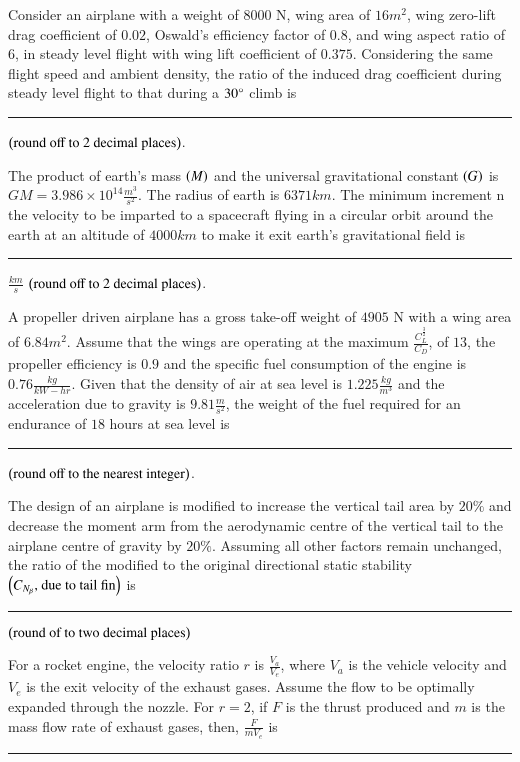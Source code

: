 \documentclass[journal]{IEEEtran}
\begin{document}
\begin{enumerate}
{\begin{figure}[H]
\label{fig:my_label}
\end{figure}
}
\item{
Consider an airplane with a weight of $8000$ N, wing area of $16m^2$, wing zero-lift drag coefficient of $0.02$, Oswald's efficiency factor of $0.8$, and wing aspect ratio of $6$, in steady level flight with wing lift coefficient of $0.375$. Considering the same flight speed and ambient density, the ratio of the induced drag coefficient during steady level flight to that during a $30\degree$ climb is \rule{2cm}{0.15mm}$\left(\text{round off to $2$ decimal places}\right)$.\\
\item{
The product of earth's mass $\left(M\right)$ and the universal gravitational constant $\left(G\right)$ is $GM=3.986\times10^{14}\frac{m^3}{s^2}$. The radius of earth is $6371km$. The minimum increment n the velocity to be imparted to a spacecraft flying in a circular orbit around the earth at an altitude of $4000km$ to make it exit earth's gravitational field is \rule{2cm}{0.15mm}$\frac{km}{s}$ $\left(\text{round off to $2$ decimal places}\right)$.\\
}
\item{
A propeller driven airplane has a gross take-off weight of $4905$ N with a wing area of $6.84 m^2$. Assume that the wings are operating at the maximum $\frac{C_L^{\frac{3}{2}}}{C_D}$, of $13$, the propeller efficiency is $0.9$ and the specific fuel consumption of the engine is $0.76\frac{kg}{kW-hr}$. Given that the density of air at sea level is $1.225\frac{kg}{m^3}$ and the acceleration due to gravity is $9.81\frac{m}{s^2}$, the weight of the fuel required for an endurance of $18$ hours at sea level is \rule{2cm}{0.15mm}$\left(\text{round off to the nearest integer}\right)$.\\
}
\item{
The design of an airplane is modified to increase the vertical tail area by $20\%$ and decrease the moment arm from the aerodynamic centre of the vertical tail to the airplane centre of gravity by $20\%$. Assuming all other factors remain unchanged, the ratio of the modified to the original directional static stability $\left(C_{N_\beta}\text{, due to tail fin}\right)$ is \rule{2cm}{0.15mm}
$\left(\text{round of to two decimal places}\right)$\\
}
\item{
For a rocket engine, the velocity ratio $r$ is $\frac{V_a}{V_e}$, where $V_a$ is the vehicle velocity and $V_e$ is the exit velocity of the exhaust gases. Assume the flow to be optimally expanded through the nozzle. For $r=2$, if $F$ is the thrust produced and $m$ is the mass flow rate of exhaust gases, then, $\frac{F}{mV_e}$ is \rule{2cm}{0.15mm}\\
}}
\end{enumerate}
\end{document}
